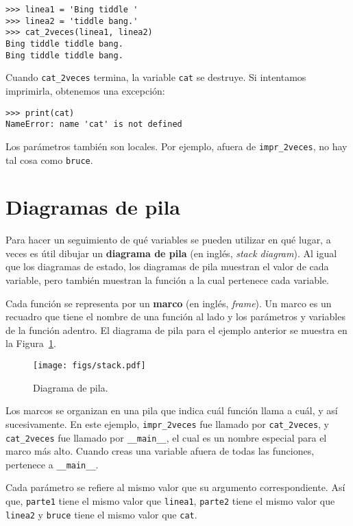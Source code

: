\documentclass[10pt]{book}
\begin{document}
\begin{verbatim}
>>> linea1 = 'Bing tiddle '
>>> linea2 = 'tiddle bang.'
>>> cat_2veces(linea1, linea2)
Bing tiddle tiddle bang.
Bing tiddle tiddle bang.
\end{verbatim}
%
Cuando \verb"cat_2veces" termina, la variable {\tt cat}
se destruye.  Si intentamos imprimirla, obtenemos una excepción:

\begin{verbatim}
>>> print(cat)
NameError: name 'cat' is not defined
\end{verbatim}
%
Los parámetros también son locales.
Por ejemplo, afuera de \verb"impr_2veces", no hay
tal cosa como {\tt bruce}.


\section{Diagramas de pila}
\label{stackdiagram}

Para hacer un seguimiento de qué variables se pueden utilizar en qué lugar, a veces es
útil dibujar un {\bf diagrama de pila} (en inglés, {\em stack diagram}).  Al igual que los diagramas de estado,
los diagramas de pila muestran el valor de cada variable, pero también muestran la
función a la cual pertenece cada variable.

Cada función se representa por un {\bf marco} (en inglés, {\em frame}).  Un marco es un recuadro que tiene
el nombre de una función al lado y los parámetros y variables de
la función adentro.  El diagrama de pila para el ejemplo anterior se
muestra en la Figura~\ref{fig.stack}.

\begin{figure}
\centerline
{\texttt{[image: figs/stack.pdf]}}
\caption{Diagrama de pila.}
\label{fig.stack}
\end{figure}


Los marcos se organizan en una pila que indica cuál función
llama a cuál, y así sucesivamente.  En este ejemplo, \verb"impr_2veces"
fue llamado por \verb"cat_2veces", y \verb"cat_2veces" fue llamado por
\verb"__main__", el cual es un nombre especial para el marco más alto.  Cuando
creas una variable afuera de todas las funciones, pertenece a
\verb"__main__".


Cada parámetro se refiere al mismo valor que su argumento
correspondiente.  Así que, {\tt parte1} tiene el mismo valor que
{\tt linea1}, {\tt parte2} tiene el mismo valor que {\tt linea2}
y {\tt bruce} tiene el mismo valor que {\tt cat}.
\end{document}
